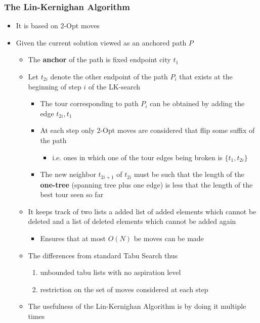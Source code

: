 \documentclass[11pt]{article}
\begin{document}
\subsubsection{The Lin-Kernighan Algorithm}
\label{sec:orgd483369}
\begin{itemize}
\item It is based on 2-Opt moves
\item Given the current solution viewed as an anchored path \(P\)
\begin{itemize}
\item The \textbf{anchor} of the path is fixed endpoint city \(t_1\)
\item Let \(t_{2i}\) denote the other endpoint of the path \(P_i\) that exists at the beginning of step \(i\) of the LK-search
\begin{itemize}
\item The tour corresponding to path \(P_i\) can be obtained by adding the edge \({t_{2i}, t_1}\)
\item At each step only 2-Opt moves are considered that flip some suffix of the path
\begin{itemize}
\item i.e. ones in which one of the tour edges being broken is \(\{t_1, t_{2i}\}\)
\end{itemize}
\item The new neighbor \(t_{2i+1}\) of \(t_{2i}\) must be such that the length of the \textbf{one-tree} (spanning tree plus one edge) is less that the length of the best tour seen so far
\end{itemize}
\item It keeps track of two lists a added list of added elements which cannot be deleted and a list of deleted elements which cannot be added again
\begin{itemize}
\item Ensures that at most \(O(N)\) be moves can be made
\end{itemize}
\item The differences from standard Tabu Search thus
\begin{enumerate}
\item unbounded tabu lists with no aspiration level
\item restriction on the set of moves considered at each step
\end{enumerate}
\item The usefulness of the Lin-Kernighan Algorithm is by doing it multiple times
\end{itemize}
\end{itemize}
\end{document}
